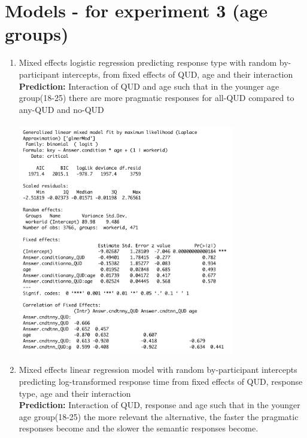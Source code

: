 \documentclass[12pt]{article}
\begin{document}
\section*{Models - for experiment 3 (age groups)}
\begin{enumerate}    
\item Mixed effects logistic regression predicting response type with random by-participant intercepts, from fixed effects of QUD, age and their interaction
\\
\textbf{Prediction:} Interaction of QUD and age such that in the younger age group(18-25) there are more pragmatic responses for all-QUD compared to any-QUD and no-QUD
\\ \\
\includegraphics[height=10cm]{models/exp3_model1.pdf}
\pagebreak
\item Mixed effects linear regression model with random by-participant intercepts predicting log-transformed response time from fixed effects of QUD, response type, age and their interaction
\\
\textbf{Prediction:} Interaction of QUD, response and age such that in the younger age group(18-25) the more relevant the alternative, the faster the pragmatic responses become and the slower the semantic responses become.
\\ \\

\end{enumerate}
\end{document}
